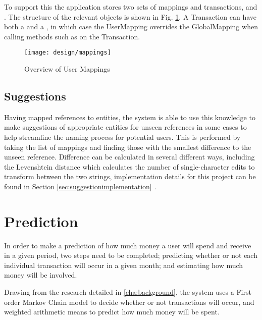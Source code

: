 To support this the application stores two sets of mappings and transactions,  and . The structure of the relevant objects is shown in Fig. \ref{fig:transactormappings}. A Transaction can have both a  and a  , in which case the UserMapping overrides the GlobalMapping when calling methods such as  on the Transaction.

\begin{figure}[h]
    \centering
    \texttt{[image: design/mappings]}
    \caption{Overview of User Mappings}
    \label{fig:transactormappings}
    
    \begin{comment}
[Transaction]<>*-0..1[UserMapping]
[Transaction]<>*-0..1-[GlobalMapping]
[User]<>-*[UserMapping]
[UserMapping]<>*-[UserTransactor]
[UserTransactor]<>*-[Category]
[GlobalTransactor]<>*-[Category]
[GlobalMapping]<>*-[GlobalTransactor]
    \end{comment}
\end{figure}

\subsection{Suggestions}
Having mapped \glspl{reference} to entities, the system is able to use this knowledge to make suggestions of appropriate entities for unseen references in some cases to help streamline the naming process for potential users.
%
This is performed by taking the list of mappings and finding those with the smallest difference to the unseen reference. Difference can be calculated in several different ways, including the Levenshtein distance which calculates the number of single-character edits to transform between the two strings, implementation details for this project can be found in Section \ref{sec:suggestionimplementation} \parencite{levenshtein1966binary}.

\section{Prediction}
In order to make a prediction of how much money a user will spend and receive in a given period, two steps need to be completed; predicting whether or not each individual transaction will occur in a given month; and estimating how much money will be involved.

Drawing from the research detailed in \autoref{cha:background}, the system uses a First-order Markov Chain model to decide whether or not transactions will occur, and weighted arithmetic means to predict how much money will be spent.


